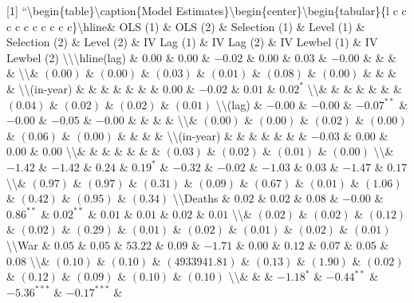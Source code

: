 \documentclass[
]{article}
\begin{document}
{[}1{]} ``\n\textbackslash begin\{table\}\n\textbackslash caption\{Model
Estimates\}\n\textbackslash begin\{center\}\n\textbackslash begin\{tabular\}\{l
c c c c c c c c c c\}\n\textbackslash hline\n \& OLS (1) \& OLS (2) \&
Selection (1) \& Level (1) \& Selection (2) \& Level (2) \& IV Lag (1)
\& IV Lag (2) \& IV Lewbel (1) \& IV Lewbel (2)
\textbackslash\textbackslash{}\n\textbackslash hline\nODA (lag) \&
\(0.00\) \& \(0.00\) \& \(-0.02\) \& \(0.00\) \& \(0.03\) \& \(-0.00\)
\& \& \& \& \textbackslash\textbackslash{}\n                   \&
\((0.00)\) \& \((0.00)\) \& \((0.03)\) \& \((0.01)\) \& \((0.08)\) \&
\((0.00)\) \& \& \& \& \textbackslash\textbackslash{}\nODA (in-year) \&
\& \& \& \& \& \& \(0.00\) \& \(-0.02\) \& \(0.01\) \& \(0.02^{*}\)
\textbackslash\textbackslash{}\n                   \& \& \& \& \& \& \&
\((0.04)\) \& \((0.02)\) \& \((0.02)\) \& \((0.01)\)
\textbackslash\textbackslash{}\nOOF (lag) \& \(-0.00\) \& \(-0.00\) \&
\(-0.07^{**}\) \& \(-0.00\) \& \(-0.05\) \& \(-0.00\) \& \& \& \&
\textbackslash\textbackslash{}\n                   \& \((0.00)\) \&
\((0.00)\) \& \((0.02)\) \& \((0.00)\) \& \((0.06)\) \& \((0.00)\) \& \&
\& \& \textbackslash\textbackslash{}\nOOF (in-year) \& \& \& \& \& \& \&
\(-0.03\) \& \(0.00\) \& \(0.00\) \& \(0.00\)
\textbackslash\textbackslash{}\n                   \& \& \& \& \& \& \&
\((0.03)\) \& \((0.02)\) \& \((0.01)\) \& \((0.00)\)
\textbackslash\textbackslash{}\nPopulation         \& \(-1.42\) \&
\(-1.42\) \& \(0.24\) \& \(0.19^{*}\) \& \(-0.32\) \& \(-0.02\) \&
\(-1.03\) \& \(0.03\) \& \(-1.47\) \& \(0.17\)
\textbackslash\textbackslash{}\n                   \& \((0.97)\) \&
\((0.97)\) \& \((0.31)\) \& \((0.09)\) \& \((0.67)\) \& \((0.01)\) \&
\((1.06)\) \& \((0.42)\) \& \((0.95)\) \& \((0.34)\)
\textbackslash\textbackslash{}\nDisaster Deaths \& \(0.02\) \& \(0.02\)
\& \(0.08\) \& \(-0.00\) \& \(0.86^{**}\) \& \(0.02^{**}\) \& \(0.01\)
\& \(0.01\) \& \(0.02\) \& \(0.01\)
\textbackslash\textbackslash{}\n                   \& \((0.02)\) \&
\((0.02)\) \& \((0.12)\) \& \((0.02)\) \& \((0.29)\) \& \((0.01)\) \&
\((0.02)\) \& \((0.01)\) \& \((0.02)\) \& \((0.01)\)
\textbackslash\textbackslash{}\nCivil War \& \(0.05\) \& \(0.05\) \&
\(53.22\) \& \(0.09\) \& \(-1.71\) \& \(0.00\) \& \(0.12\) \& \(0.07\)
\& \(0.05\) \& \(0.08\)
\textbackslash\textbackslash{}\n                   \& \((0.10)\) \&
\((0.10)\) \& \((4933941.81)\) \& \((0.13)\) \& \((1.90)\) \& \((0.02)\)
\& \((0.12)\) \& \((0.09)\) \& \((0.10)\) \& \((0.10)\)
\textbackslash\textbackslash{}\nDistance           \& \& \&
\(-1.18^{*}\) \& \(-0.44^{**}\) \& \(-5.36^{***}\) \& \(-0.17^{***}\) \&
\end{document}
